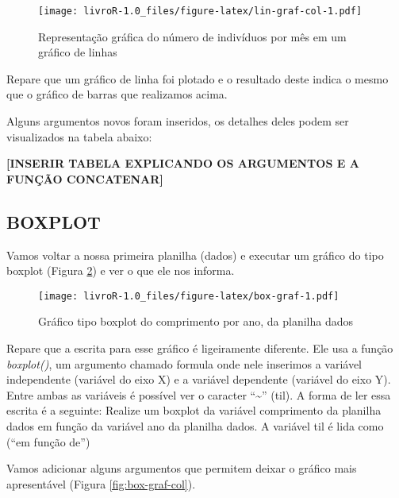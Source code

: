 \documentclass[]{book}
\newenvironment{Shaded}{\begin{snugshade}}{\end{snugshade}}
\newcommand{\DataTypeTok}[1]{\textcolor[rgb]{0.13,0.29,0.53}{#1}}
\newcommand{\KeywordTok}[1]{\textcolor[rgb]{0.13,0.29,0.53}{\textbf{#1}}}
\newcommand{\NormalTok}[1]{#1}
\newcommand{\OperatorTok}[1]{\textcolor[rgb]{0.81,0.36,0.00}{\textbf{#1}}}
\newcommand{\StringTok}[1]{\textcolor[rgb]{0.31,0.60,0.02}{#1}}
\begin{document}
\begin{figure}
\centering
\texttt{[image: livroR-1.0\_files/figure-latex/lin-graf-col-1.pdf]}
\caption{\label{fig:lin-graf-col}Representação gráfica do número de indivíduos por mês em um gráfico de linhas}
\end{figure}

Repare que um gráfico de linha foi plotado e o resultado deste indica o mesmo que o gráfico de barras que realizamos acima.

Alguns argumentos novos foram inseridos, os detalhes deles podem ser visualizados na tabela abaixo:

\textbf{{[}INSERIR TABELA EXPLICANDO OS ARGUMENTOS E A FUNÇÃO CONCATENAR{]}}

\hypertarget{boxplot}{%
\subsection{BOXPLOT}\label{boxplot}}

Vamos voltar a nossa primeira planilha (dados) e executar um gráfico do tipo boxplot (Figura \ref{fig:box-graf}) e ver o que ele nos informa.

\begin{Shaded}
\end{Shaded}

\begin{figure}
\centering
\texttt{[image: livroR-1.0\_files/figure-latex/box-graf-1.pdf]}
\caption{\label{fig:box-graf}Gráfico tipo boxplot do comprimento por ano, da planilha dados}
\end{figure}

Repare que a escrita para esse gráfico é ligeiramente diferente. Ele usa a função \emph{boxplot()}, um argumento chamado formula onde nele inserimos a variável independente (variável do eixo X) e a variável dependente (variável do eixo Y). Entre ambas as variáveis é possível ver o caracter ``\textasciitilde{}'' (til). A forma de ler essa escrita é a seguinte: Realize um boxplot da variável comprimento da planilha dados em função da variável ano da planilha dados. A variável til é lida como (``em função de'')

Vamos adicionar alguns argumentos que permitem deixar o gráfico mais apresentável (Figura \ref{fig:box-graf-col}).
\end{document}
